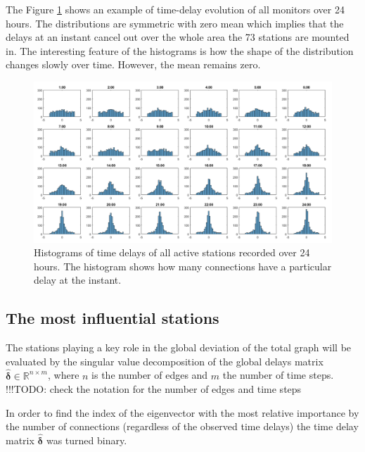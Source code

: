 \documentclass[12pt, sumlimits, intlimits]{article}
\newcommand\todo[1]{{\color{red}!!!TODO: #1}}
\begin{document}
The Figure \ref{fig:histograms} shows an example of time-delay evolution of all monitors over 24 hours. The distributions are symmetric with zero mean which implies that the delays at an instant cancel out over the whole area the 73 stations are mounted in. The interesting feature of the histograms is how the shape of the distribution changes slowly over time. However, the mean remains zero.

\begin{figure}[ht]
	\begin{center}   
		\includegraphics[width=\textwidth]{hourlydelaydistributionoverallstationsforoneday.png}
	\end{center}
	\caption{Histograms of time delays of all active stations recorded over 24 hours. The histogram shows how many connections have a particular delay at the instant.}\label{fig:histograms}
\end{figure}


\subsection{The most influential stations}

The stations playing a key role in the global deviation of the total graph will be evaluated by the singular value decomposition of the global delays matrix $\bm{\hat{\delta}} \in\mathbb{R}^{n\times m}$, where $n$ is the number of edges and $m$ the number of time steps. \todo{check the notation for the number of edges and time steps}

In order to find the index of the eigenvector with the most relative importance by the number of connections (regardless of the observed time delays) the time delay matrix $\bm{\hat{\delta}}$ was turned binary.
\end{document}
